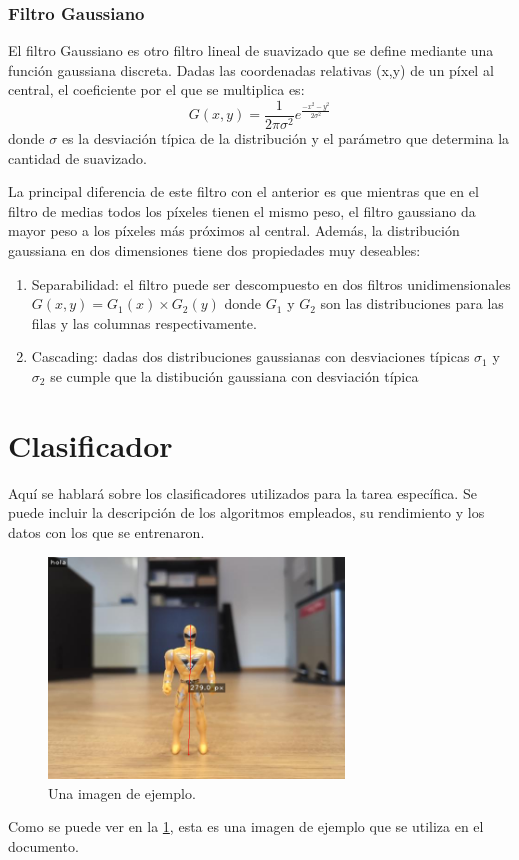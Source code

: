 \documentclass[12pt]{article}
\begin{document}
\subsubsection{Filtro Gaussiano}
El filtro Gaussiano es otro filtro lineal de suavizado que se define mediante una función gaussiana discreta. Dadas las coordenadas relativas (x,y) de un píxel al central, el coeficiente por el que se multiplica es:
$$
    G(x,y) = \frac{1}{2 \pi \sigma^2}e^\frac{-x^2-y^2}{2\sigma^2}
$$
donde $\sigma$ es la desviación típica de la distribución y el parámetro que determina la cantidad de suavizado.

La principal diferencia de este filtro con el anterior es que mientras que en el filtro de medias todos los píxeles tienen el mismo peso, el filtro gaussiano da mayor peso a los píxeles más próximos al central.
Además, la distribución gaussiana en dos dimensiones tiene dos propiedades muy deseables:
\begin{enumerate}
    \item Separabilidad: el filtro puede ser descompuesto en dos filtros unidimensionales $G(x,y) = G_1(x) \times G_2(y)$ donde $G_1$ y $G_2$ son las distribuciones para las filas y las columnas respectivamente.
    \item Cascading: dadas dos distribuciones gaussianas con desviaciones típicas $\sigma_1$ y $\sigma_2$ se cumple que la distibución gaussiana con desviación típica 
\end{enumerate}


\newpage

\section{Clasificador}
Aquí se hablará sobre los clasificadores utilizados para la tarea específica. Se puede incluir la descripción de los algoritmos empleados, su rendimiento y los datos con los que se entrenaron.


\begin{figure}[h!]
    \centering
    \includegraphics[width=0.7\textwidth]{images_calibracion/Altura_objeto.png} 
    \caption{Una imagen de ejemplo.}
    \label{fig:imagen_ejemplo}
\end{figure}

Como se puede ver en la \ref{fig:imagen_ejemplo}, esta es una imagen de ejemplo que se utiliza en el documento.
\end{document}
